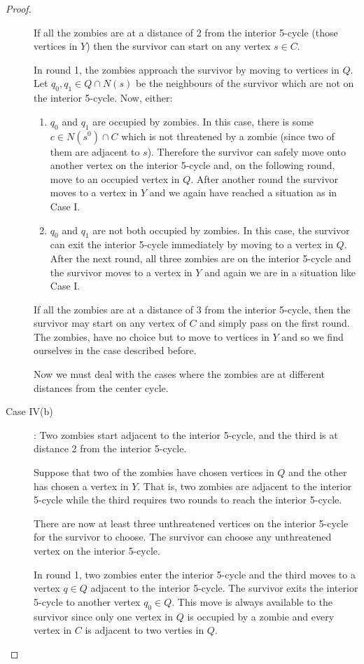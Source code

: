 \begin{proof}
\begin{description}
If all the zombies are at a distance of 2 from the interior 5-cycle (those vertices in $Y$) then the survivor can start on any vertex $s \in C$.

In round 1, the zombies approach the survivor by moving to vertices in $Q$. Let $q_0, q_1 \in Q \cap N(s)$ be the neighbours of the survivor
which are not on the interior 5-cycle. Now, either:

\begin{enumerate}
\item $q_0$ and $q_1$ are occupied by zombies. In this case, there is some $c \in N(s^0) \cap C$ which is not threatened by a zombie (since two of them are adjacent
to $s$). Therefore the survivor can safely move onto another vertex on the interior 5-cycle and, on the following round, move to an occupied vertex in $Q$. After
another round the survivor moves to a vertex in $Y$ and we again have reached a situation as in Case I.

\item $q_0$ and $q_1$ are not both occupied by zombies. In this case, the survivor can exit the interior 5-cycle immediately by moving to a vertex in $Q$. After
 the next round, all three zombies are on the interior 5-cycle and the survivor moves to a vertex in $Y$ and again we are in a situation like Case I.
\end{enumerate}

If all the zombies are at a distance of 3 from the interior 5-cycle, then the survivor may start on any vertex of $C$ and simply pass on the first round. The zombies,
have no choice but to move to vertices in $Y$ and so we find ourselves in the case described before.

Now we must deal with the cases where the zombies are at different distances from the center cycle.

\item[Case IV(b)]: Two zombies start adjacent to the interior 5-cycle, and the third is at distance 2 from the interior 5-cycle.

Suppose that two of the zombies have chosen vertices in $Q$ and the other has chosen a vertex in $Y$. That is, two zombies are adjacent to the interior 5-cycle
while the third requires two rounds to reach the interior 5-cycle.

There are now at least three unthreatened vertices on the interior 5-cycle for the survivor to choose. The survivor can choose any unthreatened vertex on
the interior 5-cycle.

In round 1, two zombies enter the interior 5-cycle and the third moves to a vertex $q \in Q$ adjacent to the interior 5-cycle.
The survivor exits the interior 5-cycle to another vertex $q_0 \in Q$. This move is always available to the survivor since only one vertex in $Q$ is occupied by
a zombie and every vertex in $C$ is adjacent to two verties in $Q$.


\end{description}
\end{proof}
